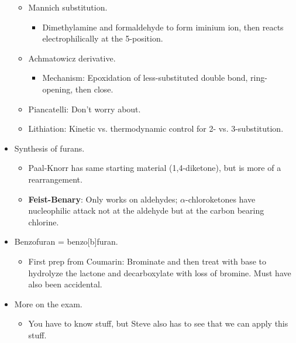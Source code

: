 \documentclass[../notes.tex]{subfiles}
\begin{document}
\begin{itemize}
\begin{itemize}
\begin{itemize}
        \end{itemize}
        \item Mannich substitution.
        \begin{itemize}
            \item Dimethylamine and formaldehyde to form iminium ion, then reacts electrophilically at the 5-position.
        \end{itemize}
        \item Achmatowicz derivative.
        \begin{itemize}
            \item Mechanism: Epoxidation of less-substituted double bond, ring-opening, then close.
        \end{itemize}
        \item Piancatelli: Don't worry about.
        \item Lithiation: Kinetic vs. thermodynamic control for 2- vs. 3-substitution.
    \end{itemize}
    \item Synthesis of furans.
    \begin{itemize}
        \item Paal-Knorr has same starting material (1,4-diketone), but is more of a rearrangement.
        \item \textbf{Feist-Benary}: Only works on aldehydes; $\alpha$-chloroketones have nucleophilic attack not at the aldehyde but at the carbon bearing chlorine.
    \end{itemize}
    \item Benzofuran = benzo[b]furan.
    \begin{itemize}
        \item First prep from Coumarin: Brominate and then treat with base to hydrolyze the lactone and decarboxylate with loss of bromine. Must have also been accidental.
    \end{itemize}
    \item More on the exam.
    \begin{itemize}
        \item You have to know stuff, but Steve also has to see that we can apply this stuff.
    \end{itemize}
\end{itemize}
\end{document}
